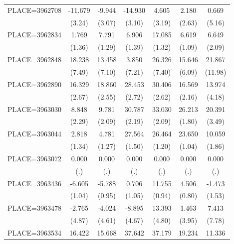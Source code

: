 {\begin{tabular}{l*{6}{c}}
PLACE=3962708       &     -11.679&      -9.944&     -14.930&       4.605&       2.180&       0.669\\
                    &      (3.24)&      (3.07)&      (3.10)&      (3.19)&      (2.63)&      (5.16)\\
PLACE=3962834       &       1.769&       7.791&       6.906&      17.085&       6.619&       6.649\\
                    &      (1.36)&      (1.29)&      (1.39)&      (1.32)&      (1.09)&      (2.09)\\
PLACE=3962848       &      18.238&      13.458&       3.850&      26.326&      15.646&      21.867\\
                    &      (7.49)&      (7.10)&      (7.21)&      (7.40)&      (6.09)&     (11.98)\\
PLACE=3962890       &      16.329&      18.860&      28.453&      30.406&      16.569&      13.974\\
                    &      (2.67)&      (2.55)&      (2.72)&      (2.62)&      (2.16)&      (4.18)\\
PLACE=3963030       &       8.848&       9.781&      30.787&      33.030&      26.213&      20.391\\
                    &      (2.29)&      (2.09)&      (2.19)&      (2.09)&      (1.80)&      (3.49)\\
PLACE=3963044       &       2.818&       4.781&      27.564&      26.464&      23.650&      10.059\\
                    &      (1.34)&      (1.27)&      (1.50)&      (1.20)&      (1.04)&      (1.86)\\
PLACE=3963072       &       0.000&       0.000&       0.000&       0.000&       0.000&       0.000\\
                    &         (.)&         (.)&         (.)&         (.)&         (.)&         (.)\\
PLACE=3963436       &      -6.605&      -5.788&       0.706&      11.755&       4.506&      -1.473\\
                    &      (1.04)&      (0.95)&      (1.05)&      (0.94)&      (0.80)&      (1.53)\\
PLACE=3963478       &      -2.765&      -4.024&      -8.895&      13.393&       1.463&       7.413\\
                    &      (4.87)&      (4.61)&      (4.67)&      (4.80)&      (3.95)&      (7.78)\\
PLACE=3963534       &      16.422&      15.668&      37.642&      37.179&      19.234&      11.336\\

\end{tabular}}
